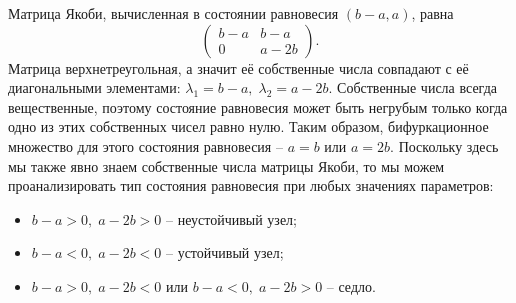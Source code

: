 Матрица Якоби, вычисленная в состоянии равновесия $\left ( b-a , a \right )$, равна   
$$ \begin{pmatrix}
	b-a & b-a \\
	0 & a-2b
\end{pmatrix} .$$
Матрица верхнетреугольная, а значит её собственные числа совпадают с её диагональными элементами:
$\lambda_1 = b-a, \; \lambda_2 = a-2b$. 
Собственные числа всегда вещественные, поэтому состояние равновесия может быть негрубым только когда одно из этих собственных чисел равно нулю. {\color{blue} Таким образом, бифуркационное множество для этого состояния равновесия -- $a = b$ или $ a = 2b$.} Поскольку здесь мы также явно знаем собственные числа матрицы Якоби, то мы можем проанализировать тип состояния равновесия при любых значениях параметров: 
\begin{itemize}
	\item{$b-a > 0, \; a-2b > 0$ -- неустойчивый узел;}
	\item{$b-a < 0, \; a-2b < 0$ -- устойчивый узел;}
	\item{$b-a > 0, \; a-2b < 0$ или $b-a < 0, \; a-2b > 0$ -- седло.}
\end{itemize}


